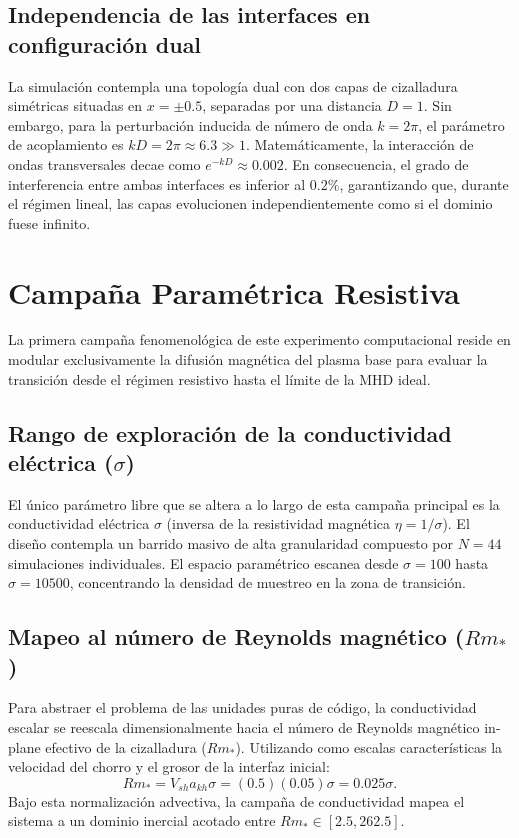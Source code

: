 \subsection{Independencia de las interfaces en configuración dual}

\primerparrafo La simulación contempla una topología dual con dos capas de cizalladura simétricas situadas en $x = \pm 0.5$, separadas por una distancia $D = 1$. Sin embargo, para la perturbación inducida de número de onda $k = 2\pi$, el parámetro de acoplamiento es $k D = 2\pi \approx 6.3 \gg 1$. Matemáticamente, la interacción de ondas transversales decae como $e^{-kD} \approx 0.002$. En consecuencia, el grado de interferencia entre ambas interfaces es inferior al $0.2\%$, garantizando que, durante el régimen lineal, las capas evolucionen independientemente como si el dominio fuese infinito.

\section{Campaña Paramétrica Resistiva}

\primerparrafo La primera campaña fenomenológica de este experimento computacional reside en modular exclusivamente la difusión magnética del plasma base para evaluar la transición desde el régimen resistivo hasta el límite de la MHD ideal.

\subsection{Rango de exploración de la conductividad eléctrica ($\sigma$)}

\primerparrafo El único parámetro libre que se altera a lo largo de esta campaña principal es la conductividad eléctrica $\sigma$ (inversa de la resistividad magnética $\eta = 1/\sigma$). El diseño contempla un barrido masivo de alta granularidad compuesto por $N=44$ simulaciones individuales. El espacio paramétrico escanea desde $\sigma = 100$ hasta $\sigma = 10500$, concentrando la densidad de muestreo en la zona de transición.

\subsection{Mapeo al número de Reynolds magnético ($Rm_*$)}

\primerparrafo Para abstraer el problema de las unidades puras de código, la conductividad escalar se reescala dimensionalmente hacia el número de Reynolds magnético in-plane efectivo de la cizalladura ($Rm_*$). Utilizando como escalas características la velocidad del chorro y el grosor de la interfaz inicial:
\begin{equation}
    Rm_* = V_{sh} a_{kh} \sigma = (0.5)(0.05)\sigma = 0.025\sigma.
\end{equation}
Bajo esta normalización advectiva, la campaña de conductividad mapea el sistema a un dominio inercial acotado entre $Rm_* \in [2.5, 262.5]$.

